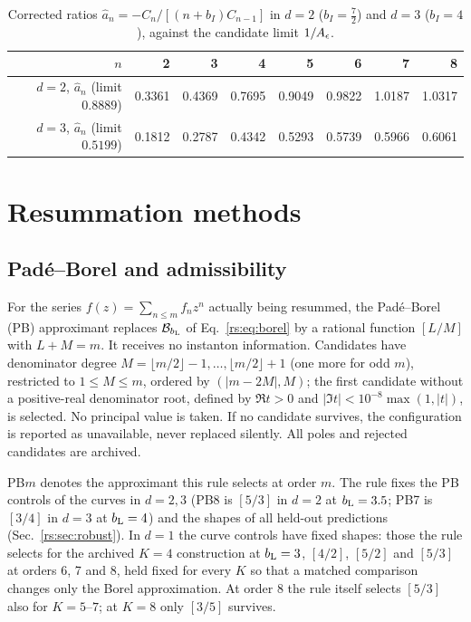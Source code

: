 \begin{table}[htbp]\centering\small
\begin{tabular}{@{}r r r r r r r r@{}}
\toprule
$n$ & 2 & 3 & 4 & 5 & 6 & 7 & 8\\ \midrule
$d=2$, $\widehat a_n$ (limit $0.8889$) & 0.3361 & 0.4369 & 0.7695 & 0.9049 & 0.9822 & 1.0187 & 1.0317\\
$d=3$, $\widehat a_n$ (limit $0.5199$) & 0.1812 & 0.2787 & 0.4342 & 0.5293 & 0.5739 & 0.5966 & 0.6061\\
\bottomrule
\end{tabular}
\caption{Corrected ratios $\widehat a_n=-C_n/[(n+b_I)C_{n-1}]$ in $d=2$ ($b_I=\frac72$) and
$d=3$ ($b_I=4$), against the candidate limit $1/A_\epsilon$.}
\label{rs:tab:ratios23}
\end{table}

\section{Resummation methods}\label{rs:sec:methods}
\subsection{Pad\'e--Borel and admissibility}\label{rs:sec:pade}
For the series $f(z)=\sum_{n\le m}f_nz^n$ actually being resummed, the Pad\'e--Borel (PB)
approximant replaces $\mathcal B_{b_{\mathrm L}}$ of Eq.~\eqref{rs:eq:borel} by a rational function $[L/M]$
with $L+M=m$. It receives no instanton information. Candidates have denominator degree
$M=\lfloor m/2\rfloor-1,\dots,\lfloor m/2\rfloor+1$ (one more for odd $m$), restricted to
$1\le M\le m$, ordered by $(|m-2M|,M)$; the first candidate without a positive-real
denominator root, defined by $\Re t>0$ and $|\Im t|<10^{-8}\max(1,|t|)$, is selected. No
principal value is taken. If no candidate survives, the configuration is reported as
unavailable, never replaced silently. All poles and rejected candidates are archived.

PB$m$ denotes the approximant this rule selects at order $m$. The rule fixes the PB controls
of the curves in $d=2,3$ (PB8 is $[5/3]$ in $d=2$ at $b_{\mathrm L}=3.5$; PB7 is $[3/4]$ in $d=3$ at
$b_{\mathrm L}=4$) and the shapes of all held-out predictions (Sec.~\ref{rs:sec:robust}). In $d=1$ the
curve controls have fixed shapes: those the rule selects for the archived $K=4$ construction
at $b_{\mathrm L}=3$, $[4/2]$, $[5/2]$ and $[5/3]$ at orders 6, 7 and 8, held fixed for every $K$ so
that a matched comparison changes only the Borel approximation. At order 8 the rule itself
selects $[5/3]$ also for $K=5$--$7$; at $K=8$ only $[3/5]$ survives.

